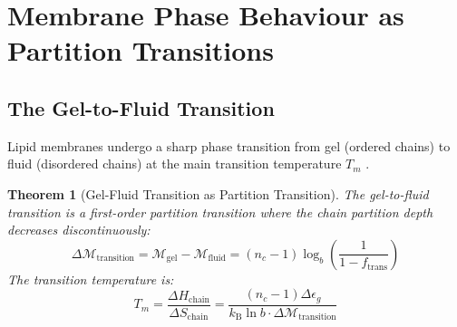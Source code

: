 \documentclass[twocolumn,10pt]{article}
\newtheorem{theorem}{Theorem}[section]
\theoremstyle{remark}
\newcommand{\kB}{k_{\mathrm{B}}}
\newcommand{\Depth}{\mathcal{M}}
\begin{document}
\section{Membrane Phase Behaviour as Partition Transitions}
\label{sec:phases}

\subsection{The Gel-to-Fluid Transition}

Lipid membranes undergo a sharp phase transition from gel (ordered chains) to fluid (disordered chains) at the main transition temperature $T_m$ \cite{nagle1980,marsh2013}.

\begin{theorem}[Gel-Fluid Transition as Partition Transition]
\label{thm:gel_fluid}
The gel-to-fluid transition is a first-order partition transition where the chain partition depth decreases discontinuously:
\begin{equation}
    \Delta\Depth_{\text{transition}} = \Depth_{\text{gel}} - \Depth_{\text{fluid}} = (n_c - 1) \log_b\left(\frac{1}{1-f_{\text{trans}}}\right)
\end{equation}
The transition temperature is:
\begin{equation}
    T_m = \frac{\Delta H_{\text{chain}}}{\Delta S_{\text{chain}}} = \frac{(n_c - 1)\Delta\epsilon_g}{\kB \ln b \cdot \Delta\Depth_{\text{transition}}}
\end{equation}
\end{theorem}
\end{document}
